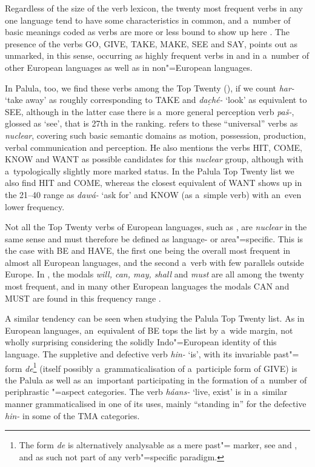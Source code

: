 Regardless of the size of the verb lexicon, the twenty most frequent verbs in any one language tend to have some characteristics in common, and a~number of basic meanings coded as verbs are more or less bound to show up here \citep[209]{viberg2006}. The presence of the verbs GO, GIVE, TAKE, MAKE, SEE and SAY, \citet[247]{viberg1993} points out as unmarked, in this sense, occurring as highly frequent verbs in \iliEnglish and in a~number of other European languages as well as in non"=European languages. 



In Palula, too, we find these verbs among the Top Twenty (), if we count \textit{har-} `take away' as roughly corresponding to TAKE and \textit{dac̣hé-} `look' as equivalent to SEE, although in the latter case there is a~more general perception verb \textit{paš-}, glossed as `see', that is 27th in the ranking. \citet[409]{viberg2006} refers to these ``universal'' verbs as \textit{nuclear}, covering such basic semantic domains as motion, possession, production, verbal communication and perception. He also mentions the verbs HIT, COME, KNOW and WANT as possible candidates for this \textit{nuclear} group, although with a~typologically slightly more marked status. In the Palula Top Twenty list we also find HIT and COME, whereas the closest equivalent of WANT shows up in the 21--40 range as \textit{dawá-} `ask for' and KNOW (as a~simple verb) with an~even lower frequency.



Not all the Top Twenty verbs of European languages, such as \iliEnglish, are \textit{nuclear} in the same sense and must therefore be defined as language- or area"=specific. This is the case with BE and HAVE, the first one being the overall most frequent in almost all European languages, and the second a~verb with few parallels outside Europe. In \iliEnglish, the modals \textit{will, can, may, shall} and \textit{must} are all among the twenty most frequent, and in many other European languages the modals CAN and MUST are found in this frequency range \citep[346--349]{viberg1993}. 



A similar tendency can be seen when studying the Palula Top Twenty list. As in European languages,
an~equivalent of BE tops the list by a~wide margin, not wholly surprising considering the solidly
Indo"=European identity of this language. The suppletive and defective verb \textit{hin-} `is', with its invariable past"= form \textit{de}\footnote{The form \textit{de} is alternatively analysable as a mere past"= marker, see  and , and as such not part of any verb"=specific paradigm.} (itself possibly a~grammaticalisation of a~participle form of GIVE) is the Palula  as well as an~important  participating in the formation of a~number of periphrastic "=aspect categories. The verb \textit{háans-} `live, exist' is in a~similar manner grammaticalised in one of its uses, mainly ``standing in'' for the defective \textit{hin-} in some of the TMA categories.


